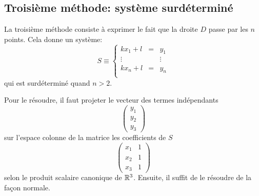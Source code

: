 \subsection{Troisième méthode: système surdéterminé}

La troisième méthode consiste à exprimer
le fait que la droite $D$ passe par les $n$ points.
Cela donne un système:
\begin{equation}
    S\equiv \left\{
        \begin{array}{ccl}
            kx_1+l &=& y_1 \\
            \vdots && \vdots \\
            kx_n+l &=& y_n \\
        \end{array}
    \right.
\end{equation}
qui est surdéterminé quand $n>2$.

Pour le résoudre, il faut projeter le vecteur des termes indépendants
\[
    \left(
        \begin{array}{c}
            y_1\\
            y_2\\
            y_3
        \end{array}
    \right)
\]
sur l'espace colonne de la matrice les coefficients de $S$
\[
    \left(
        \begin{array}{rc}
            x_1&1\\
            x_2&1\\
            x_3&1
        \end{array}
    \right)
\]
selon le produit scalaire canonique de $\mathbb{R}^3$.
Ensuite, il suffit de le résoudre de la façon normale.
